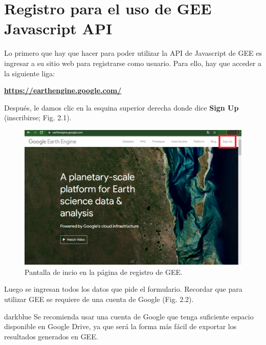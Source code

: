 \documentclass[
  12pt,
  letterpaper,
  twoside]{book}
\begin{document}
\hypertarget{registro-para-el-uso-de-gee-javascript-api}{%
\section{Registro para el uso de GEE Javascript API}\label{registro-para-el-uso-de-gee-javascript-api}}

Lo primero que hay que hacer para poder utilizar la API de Javascript de GEE es ingresar a su sitio web para registrarse como usuario. Para ello, hay que acceder a la siguiente liga:

\textbf{\url{https://earthengine.google.com/}}

Después, le damos clic en la esquina superior derecha donde dice \textbf{Sign Up} (inscribirse; Fig. 2.1).

\begin{figure}[btp]

{\centering \includegraphics[width=0.9\linewidth]{Img/Signup} 

}

\caption{Pantalla de incio en la página de registro de GEE.}\label{fig:unnamed-chunk-2}
\end{figure}

Luego se ingresan todos los datos que pide el formulario. Recordar que para utilizar GEE se requiere de una cuenta de Google (Fig. 2.2).

\begin{bluebox2}

\begin{awesomeblock}{5pt}{\faLightbulb}{darkblue}
Se recomienda usar una cuenta de Google que tenga suficiente espacio disponible en Google Drive, ya que será la forma más fácil de exportar los resultados generados en GEE.

\end{awesomeblock}

\end{bluebox2}
\end{document}
